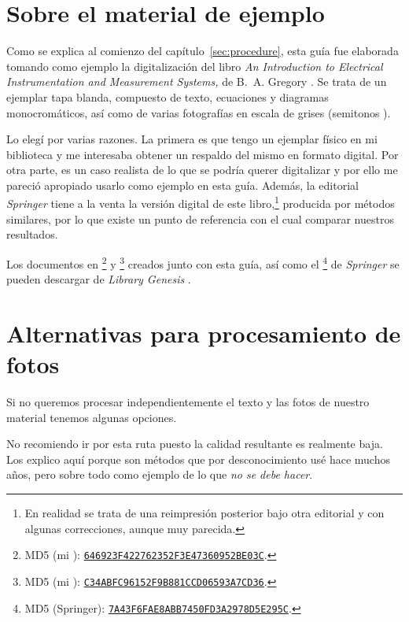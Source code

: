 \documentclass[%
	a5paper,
	10pt,
	twoside,
	openright,
	final,
]{memoir}
\begin{document}
	\chapter{Sobre el material de ejemplo\label{sec:aboutGregory}} Como se explica al comienzo del capítulo~\ref{sec:procedure}, esta guía fue elaborada tomando como ejemplo la digitalización del libro \emph{An Introduction to Electrical Instrumentation and Measurement Systems,} de B.~A. Gregory \cite{GregorySpringer}. Se trata de un ejemplar tapa blanda, compuesto de texto, ecuaciones y diagramas monocromáticos, así como de varias fotografías en escala de grises (semitonos \cite{WikipediaHalftone}).

	Lo elegí por varias razones. La primera es que tengo un ejemplar físico en mi biblioteca y me interesaba obtener un respaldo del mismo en formato digital. Por otra parte, es un caso realista de lo que se podría querer digitalizar y por ello me pareció apropiado usarlo como ejemplo en esta guía. Además, la editorial \emph{Springer} tiene a la venta la versión digital de este libro,\footnote{En realidad se trata de una reimpresión posterior bajo otra editorial y con algunas correcciones, aunque muy parecida.} producida por métodos similares, por lo que existe un punto de referencia con el cual comparar nuestros resultados.

	Los documentos en \pdf\footnote{MD5 (mi \pdf): \href{http://gen.lib.rus.ec/book/index.php?md5=646923F422762352F3E47360952BE03C}{\texttt{646923F422762352F3E47360952BE03C}}.} y \djvu\footnote{MD5 (mi \djvu): \href{http://gen.lib.rus.ec/book/index.php?md5=C34ABFC96152F9B881CCD06593A7CD36}{\texttt{C34ABFC96152F9B881CCD06593A7CD36}}.} creados junto con esta guía, así como el \pdf\footnote{MD5 (\pdf Springer): \href{http://gen.lib.rus.ec/book/index.php?md5=7A43F6FAE8ABB7450FD3A2978D5E295C}{\texttt{7A43F6FAE8ABB7450FD3A2978D5E295C}}.} de \emph{Springer} se pueden descargar de \emph{Library Genesis} \cite{LibGen}.

	\chapter{Alternativas para procesamiento de fotos\label{sec:noSplitPages}} Si no queremos procesar independientemente el texto y las fotos de nuestro material tenemos algunas opciones.

	 No recomiendo ir por esta ruta puesto la calidad resultante es realmente baja. Los explico aquí porque son métodos que por desconocimiento usé hace muchos años, pero sobre todo como ejemplo de lo que \emph{no se debe hacer}.
\end{document}
